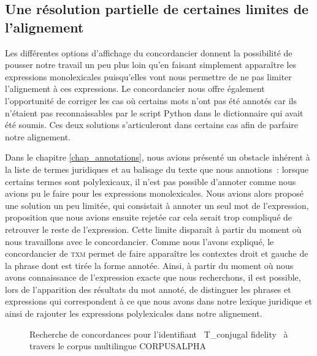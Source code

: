 \subsection{\label{section_resolution}Une résolution partielle de certaines limites de l’alignement}
Les différentes options d’affichage du concordancier donnent la possibilité de pousser notre travail un peu plus loin qu’en faisant simplement apparaître les expressions monolexicales puisqu’elles vont nous permettre de ne pas limiter l’alignement à ces expressions. Le concordancier nous offre également l’opportunité de corriger les cas où certains mots n’ont pas été annotés car ils n’étaient pas reconnaissables par le script Python dans le dictionnaire qui avait été soumis. Ces deux solutions s’articuleront dans certains cas afin de parfaire notre alignement.

Dans le chapitre \ref{chap_annotations}, nous avions présenté un obstacle inhérent à la liste de termes juridiques et au balisage du texte que nous annotions~: lorsque certains termes sont polylexicaux, il n’est pas possible d’annoter comme nous avions pu le faire pour les expressions monolexicales. Nous avions alors proposé une solution un peu limitée, qui consistait à annoter un seul mot de l’expression, proposition que nous avions ensuite rejetée car cela serait trop compliqué de retrouver le reste de l’expression. Cette limite disparaît à partir du moment où nous travaillons avec le concordancier. Comme nous l’avons expliqué, le concordancier de \textsc{txm} permet de faire apparaître les contextes droit et gauche de la phrase dont est tirée la forme annotée. Ainsi, à partir du moment où nous avons connaissance de l’expression exacte que nous recherchons, il est possible, lors de l’apparition des résultats du mot annoté, de distinguer les phrases et expressions qui correspondent à ce que nous avons dans notre lexique juridique et ainsi de rajouter les expressions polylexicales dans notre alignement.
\begin{figure}[p]
    \centering
    \caption{Recherche de concordances pour l’identifiant \og~T\_conjugal fidelity~\fg{} à travers le corpus multilingue CORPUSALPHA}
    \label{fig:concordancier_conjugal_fidelity}
\end{figure}

